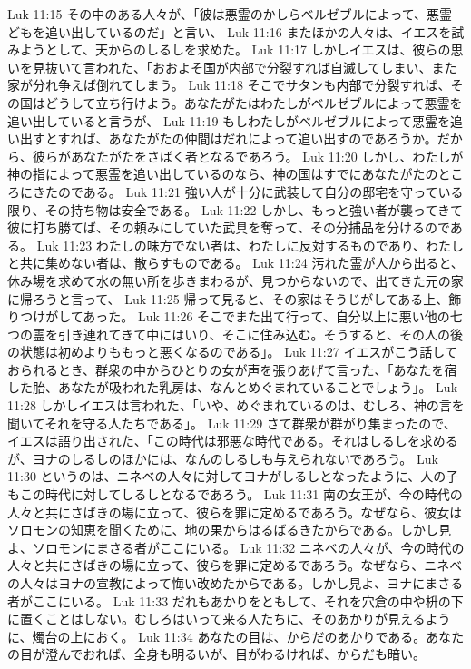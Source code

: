 Luk 11:15  その中のある人々が、「彼は悪霊のかしらベルゼブルによって、悪霊どもを追い出しているのだ」と言い、
Luk 11:16  またほかの人々は、イエスを試みようとして、天からのしるしを求めた。
Luk 11:17  しかしイエスは、彼らの思いを見抜いて言われた、「おおよそ国が内部で分裂すれば自滅してしまい、また家が分れ争えば倒れてしまう。
Luk 11:18  そこでサタンも内部で分裂すれば、その国はどうして立ち行けよう。あなたがたはわたしがベルゼブルによって悪霊を追い出していると言うが、
Luk 11:19  もしわたしがベルゼブルによって悪霊を追い出すとすれば、あなたがたの仲間はだれによって追い出すのであろうか。だから、彼らがあなたがたをさばく者となるであろう。
Luk 11:20  しかし、わたしが神の指によって悪霊を追い出しているのなら、神の国はすでにあなたがたのところにきたのである。
Luk 11:21  強い人が十分に武装して自分の邸宅を守っている限り、その持ち物は安全である。
Luk 11:22  しかし、もっと強い者が襲ってきて彼に打ち勝てば、その頼みにしていた武具を奪って、その分捕品を分けるのである。
Luk 11:23  わたしの味方でない者は、わたしに反対するものであり、わたしと共に集めない者は、散らすものである。
Luk 11:24  汚れた霊が人から出ると、休み場を求めて水の無い所を歩きまわるが、見つからないので、出てきた元の家に帰ろうと言って、
Luk 11:25  帰って見ると、その家はそうじがしてある上、飾りつけがしてあった。
Luk 11:26  そこでまた出て行って、自分以上に悪い他の七つの霊を引き連れてきて中にはいり、そこに住み込む。そうすると、その人の後の状態は初めよりももっと悪くなるのである」。
Luk 11:27  イエスがこう話しておられるとき、群衆の中からひとりの女が声を張りあげて言った、「あなたを宿した胎、あなたが吸われた乳房は、なんとめぐまれていることでしょう」。
Luk 11:28  しかしイエスは言われた、「いや、めぐまれているのは、むしろ、神の言を聞いてそれを守る人たちである」。
Luk 11:29  さて群衆が群がり集まったので、イエスは語り出された、「この時代は邪悪な時代である。それはしるしを求めるが、ヨナのしるしのほかには、なんのしるしも与えられないであろう。
Luk 11:30  というのは、ニネベの人々に対してヨナがしるしとなったように、人の子もこの時代に対してしるしとなるであろう。
Luk 11:31  南の女王が、今の時代の人々と共にさばきの場に立って、彼らを罪に定めるであろう。なぜなら、彼女はソロモンの知恵を聞くために、地の果からはるばるきたからである。しかし見よ、ソロモンにまさる者がここにいる。
Luk 11:32  ニネベの人々が、今の時代の人々と共にさばきの場に立って、彼らを罪に定めるであろう。なぜなら、ニネベの人々はヨナの宣教によって悔い改めたからである。しかし見よ、ヨナにまさる者がここにいる。
Luk 11:33  だれもあかりをともして、それを穴倉の中や枡の下に置くことはしない。むしろはいって来る人たちに、そのあかりが見えるように、燭台の上におく。
Luk 11:34  あなたの目は、からだのあかりである。あなたの目が澄んでおれば、全身も明るいが、目がわるければ、からだも暗い。
